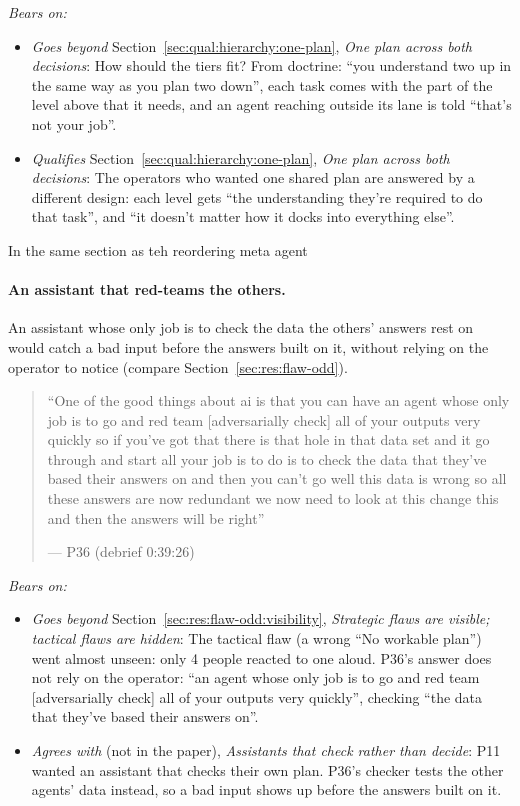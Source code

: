 \noindent\textit{Bears on:}
\begin{itemize}[leftmargin=1.2em,itemsep=1pt]\small
\item \textit{Goes beyond} Section~\ref{sec:qual:hierarchy:one-plan}, \emph{One plan across both decisions}: How should the tiers fit? From doctrine: ``you understand two up in the same way as you plan two down'', each task comes with the part of the level above that it needs, and an agent reaching outside its lane is told ``that's not your job''.
\item \textit{Qualifies} Section~\ref{sec:qual:hierarchy:one-plan}, \emph{One plan across both decisions}: The operators who wanted one shared plan are answered by a different design: each level gets ``the understanding they're required to do that task'', and ``it doesn't matter how it docks into everything else''.
\end{itemize}


In the same section as teh reordering meta agent
\label{sec:qual:practitioner:pt-red-team}\paragraph{An assistant that red-teams the others.}
An assistant whose only job is to check the data the others' answers rest on would catch a bad input before the answers built on it, without relying on the operator to notice (compare Section~\ref{sec:res:flaw-odd}).

\begin{quote}\small
``One of the good things about ai is that you can have an agent whose only job is to go and red team [adversarially check] all of your outputs very quickly so if you've got that there is that hole in that data set and it go through and start all your job is to do is to check the data that they've based their answers on and then you can't go well this data is wrong so all these answers are now redundant we now need to look at this change this and then the answers will be right''\par\hfill--- P36 (debrief 0:39:26)
\end{quote}

\noindent\textit{Bears on:}
\begin{itemize}[leftmargin=1.2em,itemsep=1pt]\small
\item \textit{Goes beyond} Section~\ref{sec:res:flaw-odd:visibility}, \emph{Strategic flaws are visible; tactical flaws are hidden}: The tactical flaw (a wrong ``No workable plan'') went almost unseen: only 4 people reacted to one aloud. P36's answer does not rely on the operator: ``an agent whose only job is to go and red team [adversarially check] all of your outputs very quickly'', checking ``the data that they've based their answers on''.
\item \textit{Agrees with} (not in the paper), \emph{Assistants that check rather than decide}: P11 wanted an assistant that checks their own plan. P36's checker tests the other agents' data instead, so a bad input shows up before the answers built on it.
\end{itemize}

